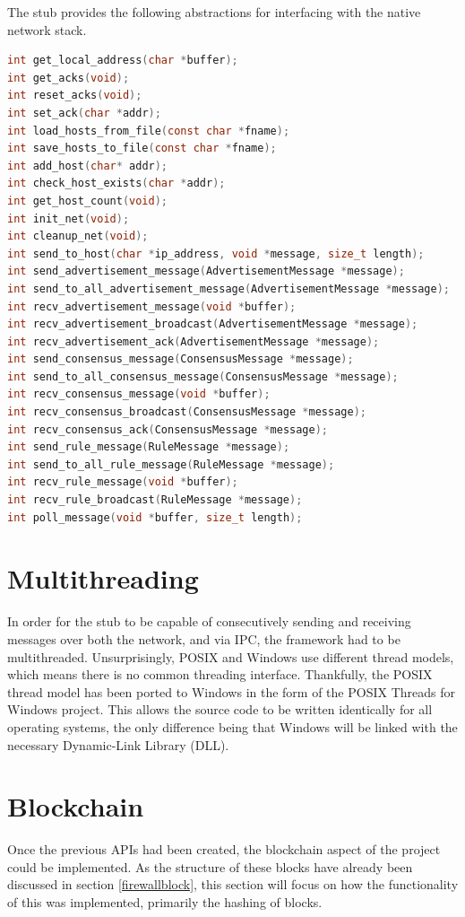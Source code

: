 \documentclass[a4paper, 11pt]{report}
\begin{document}
The \gls{stub} provides the following abstractions for interfacing with the native network stack.
\begin{lstlisting}[language=c,style=c,caption=Network API]
int get_local_address(char *buffer);
int get_acks(void);
int reset_acks(void);
int set_ack(char *addr);
int load_hosts_from_file(const char *fname);
int save_hosts_to_file(const char *fname);
int add_host(char* addr);
int check_host_exists(char *addr);
int get_host_count(void);
int init_net(void);
int cleanup_net(void);
int send_to_host(char *ip_address, void *message, size_t length);
int send_advertisement_message(AdvertisementMessage *message);
int send_to_all_advertisement_message(AdvertisementMessage *message);
int recv_advertisement_message(void *buffer);
int recv_advertisement_broadcast(AdvertisementMessage *message);
int recv_advertisement_ack(AdvertisementMessage *message);
int send_consensus_message(ConsensusMessage *message);
int send_to_all_consensus_message(ConsensusMessage *message);
int recv_consensus_message(void *buffer);
int recv_consensus_broadcast(ConsensusMessage *message);
int recv_consensus_ack(ConsensusMessage *message);
int send_rule_message(RuleMessage *message);
int send_to_all_rule_message(RuleMessage *message);
int recv_rule_message(void *buffer);
int recv_rule_broadcast(RuleMessage *message);
int poll_message(void *buffer, size_t length);
\end{lstlisting}

\section{Multithreading}
In order for the \gls{stub} to be capable of consecutively sending and receiving messages over both the network, and via \acrshort{IPC}, the framework had to be multithreaded. Unsurprisingly, \acrshort{POSIX} and Windows use different thread models, which means there is no common threading interface. Thankfully, the \acrshort{POSIX} thread model has been ported to Windows in the form of the \acrshort{POSIX} Threads for Windows project\cite{pthread}. This allows the source code to be written identically for all operating systems, the only difference being that Windows will be linked with the necessary Dynamic-Link Library (DLL).

\section{Blockchain}
Once the previous \acrshort{API}s had been created, the \gls{blockchain} aspect of the project could be implemented. As the structure of these blocks have already been discussed in section \ref{firewallblock}, this section will focus on how the functionality of this was implemented, primarily the \gls{hashing} of blocks.
\end{document}
